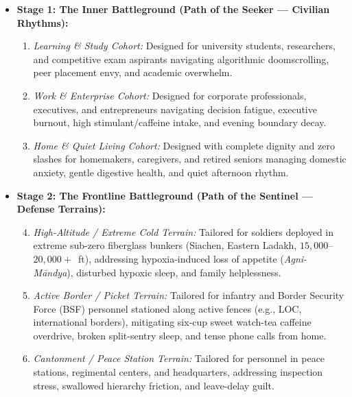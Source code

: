 \documentclass[11pt,a4paper]{article}
\begin{document}
\begin{itemize}[leftmargin=*]
    \item \textbf{Stage 1: The Inner Battleground (Path of the Seeker --- Civilian Rhythms):}
    \begin{enumerate}
        \item \textit{Learning \& Study Cohort:} Designed for university students, researchers, and competitive exam aspirants navigating algorithmic doomscrolling, peer placement envy, and academic overwhelm.
        \item \textit{Work \& Enterprise Cohort:} Designed for corporate professionals, executives, and entrepreneurs navigating decision fatigue, executive burnout, high stimulant/caffeine intake, and evening boundary decay.
        \item \textit{Home \& Quiet Living Cohort:} Designed with complete dignity and zero slashes for homemakers, caregivers, and retired seniors managing domestic anxiety, gentle digestive health, and quiet afternoon rhythm.
    \end{enumerate}
    \item \textbf{Stage 2: The Frontline Battleground (Path of the Sentinel --- Defense Terrains):}
    \begin{enumerate}
        \setcounter{enumi}{3}
        \item \textit{High-Altitude / Extreme Cold Terrain:} Tailored for soldiers deployed in extreme sub-zero fiberglass bunkers (Siachen, Eastern Ladakh, $15{,}000$--$20{,}000+$~ft), addressing hypoxia-induced loss of appetite (\textit{Agni-M\=andya}), disturbed hypoxic sleep, and family helplessness.
        \item \textit{Active Border / Picket Terrain:} Tailored for infantry and Border Security Force (BSF) personnel stationed along active fences (e.g., LOC, international borders), mitigating six-cup sweet watch-tea caffeine overdrive, broken split-sentry sleep, and tense phone calls from home.
        \item \textit{Cantonment / Peace Station Terrain:} Tailored for personnel in peace stations, regimental centers, and headquarters, addressing inspection stress, swallowed hierarchy friction, and leave-delay guilt.
    \end{enumerate}
\end{itemize}
\end{document}
